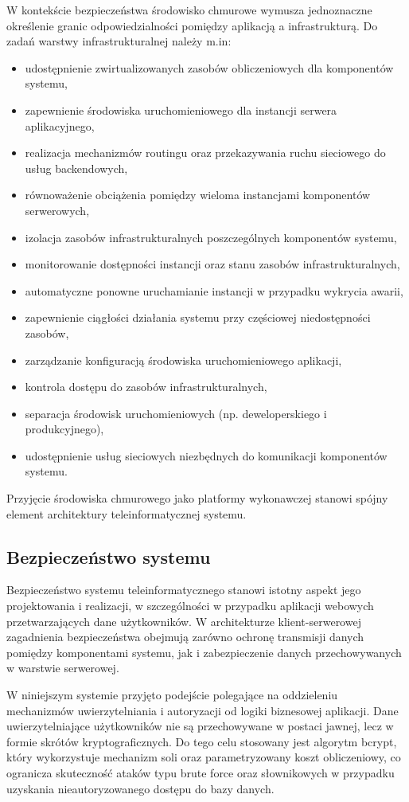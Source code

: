\documentclass[a4paper,twoside,12pt]{book}
\begin{document}
W kontekście bezpieczeństwa środowisko chmurowe wymusza jednoznaczne
określenie granic odpowiedzialności pomiędzy aplikacją a infrastrukturą.
Do zadań warstwy infrastrukturalnej należy m.in:
\begin{itemize}
\item udostępnienie zwirtualizowanych zasobów obliczeniowych dla komponentów systemu,
\item zapewnienie środowiska uruchomieniowego dla instancji serwera aplikacyjnego,
\item realizacja mechanizmów routingu oraz przekazywania ruchu sieciowego do usług backendowych,
\item równoważenie obciążenia pomiędzy wieloma instancjami komponentów serwerowych,
\item izolacja zasobów infrastrukturalnych poszczególnych komponentów systemu,
\item monitorowanie dostępności instancji oraz stanu zasobów infrastrukturalnych,
\item automatyczne ponowne uruchamianie instancji w przypadku wykrycia awarii,
\item zapewnienie ciągłości działania systemu przy częściowej niedostępności zasobów,
\item zarządzanie konfiguracją środowiska uruchomieniowego aplikacji,
\item kontrola dostępu do zasobów infrastrukturalnych,
\item separacja środowisk uruchomieniowych (np. deweloperskiego i produkcyjnego),
\item udostępnienie usług sieciowych niezbędnych do komunikacji komponentów systemu.
\end{itemize}
Przyjęcie środowiska chmurowego jako platformy wykonawczej stanowi
spójny element architektury teleinformatycznej systemu.

\subsection{Bezpieczeństwo systemu}
Bezpieczeństwo systemu teleinformatycznego stanowi istotny aspekt jego projektowania
i realizacji, w szczególności w przypadku aplikacji webowych przetwarzających dane
użytkowników. W architekturze klient-serwerowej zagadnienia bezpieczeństwa obejmują
zarówno ochronę transmisji danych pomiędzy komponentami systemu, jak i zabezpieczenie
danych przechowywanych w warstwie serwerowej.

W niniejszym systemie przyjęto podejście polegające na oddzieleniu mechanizmów
uwierzytelniania i autoryzacji od logiki biznesowej aplikacji. Dane uwierzytelniające
użytkowników nie są przechowywane w postaci jawnej, lecz w formie skrótów kryptograficznych.
Do tego celu stosowany jest algorytm bcrypt, który wykorzystuje mechanizm soli oraz
parametryzowany koszt obliczeniowy, co ogranicza skuteczność ataków typu brute force
oraz słownikowych w przypadku uzyskania nieautoryzowanego dostępu do bazy danych.
\end{document}
